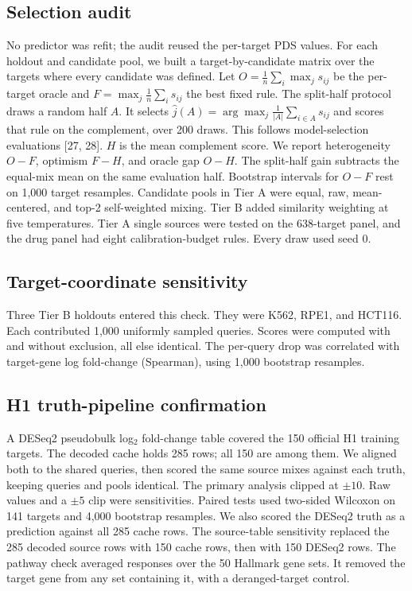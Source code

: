 \documentclass[12pt]{article}
\begin{document}
\subsection*{Selection audit}

No predictor was refit; the audit reused the per-target PDS values. For each holdout and candidate pool, we built a target-by-candidate matrix over the targets where every candidate was defined. Let $O = \frac{1}{n}\sum_i \max_j s_{ij}$ be the per-target oracle and $F = \max_j \frac{1}{n}\sum_i s_{ij}$ the best fixed rule. The split-half protocol draws a random half $A$. It selects $\hat{j}(A) = \arg\max_j \frac{1}{|A|}\sum_{i \in A} s_{ij}$ and scores that rule on the complement, over 200 draws. This follows model-selection evaluations [27, 28]. $H$ is the mean complement score. We report heterogeneity $O-F$, optimism $F-H$, and oracle gap $O-H$. The split-half gain subtracts the equal-mix mean on the same evaluation half. Bootstrap intervals for $O-F$ rest on 1,000 target resamples. Candidate pools in Tier A were equal, raw, mean-centered, and top-2 self-weighted mixing. Tier B added similarity weighting at five temperatures. Tier A single sources were tested on the 638-target panel, and the drug panel had eight calibration-budget rules. Every draw used seed 0.

\subsection*{Target-coordinate sensitivity}

Three Tier B holdouts entered this check. They were K562, RPE1, and HCT116. Each contributed 1,000 uniformly sampled queries. Scores were computed with and without exclusion, all else identical. The per-query drop was correlated with target-gene log fold-change (Spearman), using 1,000 bootstrap resamples.

\subsection*{H1 truth-pipeline confirmation}

A DESeq2 pseudobulk log$_2$ fold-change table covered the 150 official H1 training targets. The decoded cache holds 285 rows; all 150 are among them. We aligned both to the shared queries, then scored the same source mixes against each truth, keeping queries and pools identical. The primary analysis clipped at $\pm 10$. Raw values and a $\pm 5$ clip were sensitivities. Paired tests used two-sided Wilcoxon on 141 targets and 4,000 bootstrap resamples. We also scored the DESeq2 truth as a prediction against all 285 cache rows. The source-table sensitivity replaced the 285 decoded source rows with 150 cache rows, then with 150 DESeq2 rows. The pathway check averaged responses over the 50 Hallmark gene sets. It removed the target gene from any set containing it, with a deranged-target control.
\end{document}
